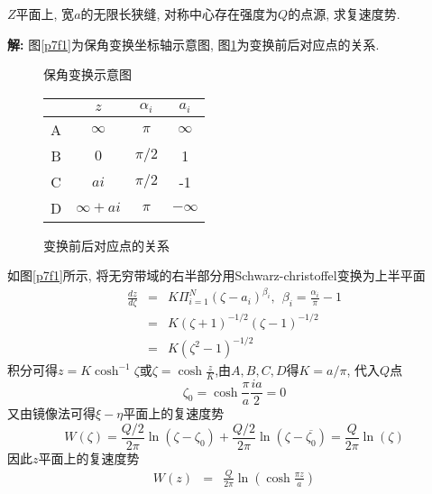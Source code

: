 \begin{problem}[问题6.7]
$Z$平面上, 宽$a$的无限长狭缝, 对称中心存在强度为$Q$的点源, 求复速度势.
\end{problem}
\begin{solution}
\textbf{解:} 图\ref{p7f1}为保角变换坐标轴示意图, 图\ref{p7f2}为变换前后对应点的关系.
\begin{figure}[!htb]
\begin{minipage}[b]{.65\textwidth}
\centering

\vspace{-0.25em}
\caption{\label{p7f1}保角变换示意图}
\end{minipage}%
\begin{minipage}[b]{.35\textwidth}
\centering
\begin{tabular}{l|lll}
\multicolumn{1}{c|}{} & \multicolumn{1}{c}{$z$} & \multicolumn{1}{c}{$\alpha_i$} & \multicolumn{1}{c}{$a_i$} \\
\hline
\multicolumn{1}{c|}{A} & \multicolumn{1}{c}{$\infty$} & \multicolumn{1}{c}{$\pi$} & \multicolumn{1}{c}{$\infty$} \\
\multicolumn{1}{c|}{B} & \multicolumn{1}{c}{$0$} & \multicolumn{1}{c}{$\pi/2$} & \multicolumn{1}{c}{1} \\
\multicolumn{1}{c|}{C} & \multicolumn{1}{c}{$ai$} & \multicolumn{1}{c}{$\pi/2$} & \multicolumn{1}{c}{-1} \\
\multicolumn{1}{c|}{D} & \multicolumn{1}{c}{$\infty+ai$} & \multicolumn{1}{c}{$\pi$} & \multicolumn{1}{c}{$-\infty$} \\
\end{tabular}
\caption{\label{p7f2}变换前后对应点的关系}
\end{minipage}
\end{figure}

\noindent 如图\ref{p7f1}所示, 将无穷带域的右半部分用Schwarz-christoffel变换为上半平面
\begin{eqnarray}
\frac{dz}{d\zeta} &=& K\Pi_{i=1}^N(\zeta-a_i)^{\beta_i}, {~~} \beta_i = \frac{\alpha_i}{\pi}-1\nonumber\\
&=& K(\zeta+1)^{-1/2}(\zeta-1)^{-1/2}\nonumber\\
&=& K(\zeta^2-1)^{-1/2}\nonumber
\end{eqnarray}
积分可得$z=K\cosh^{-1}\zeta$或$\zeta=\cosh \frac{z}{K}$,由$A,B,C,D$得$K=a/\pi$, 代入$Q$点
\[
\zeta_0 = \cosh\frac{\pi}{a}\frac{ia}{2} = 0
\]
又由镜像法可得$\xi-\eta$平面上的复速度势
\[
W(\zeta) = \frac{Q/2}{2\pi}\ln(\zeta-\zeta_0) + \frac{Q/2}{2\pi}\ln(\zeta-\overline{\zeta_0}) = \frac{Q}{2\pi}\ln(\zeta)
\]
因此$z$平面上的复速度势
\begin{eqnarray}
W(z) &=& \frac{Q}{2\pi}\ln(\cosh \frac{\pi z}{a})
\end{eqnarray}


\end{solution}

